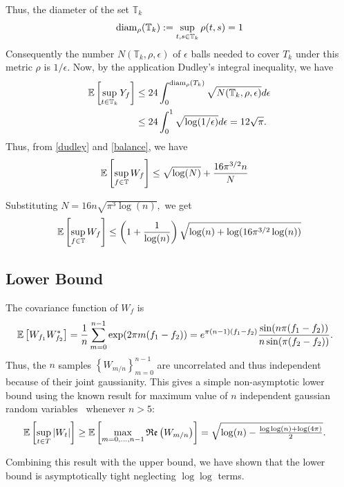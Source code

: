 Thus, the diameter of the set $\mathbb{T}_k$
\begin{align*}
\operatorname{diam}_\rho(\mathbb{T}_k) &:= \sup_{t,s  \in \mathbb{T}_k}\rho(t,s) = 1\\
\end{align*}
Consequently the number $N(\mathbb{T}_k, \rho, \epsilon)$ of $\epsilon$ balls needed to cover $T_k$ under this metric $\rho$ is $1/\epsilon$. Now, by the application Dudley's integral inequality, we have
\begin{align}
\operatorname{\mathbb{E}}\left[\sup_{t \in \mathbb{T}_k} Y_f \right] & \leq 24 \int_0^{\operatorname{diam}_\rho(T_k)} \sqrt{N(\mathbb{T}_k, \rho, \epsilon)} d\epsilon\\
 & \leq 24 \int_0^1 \sqrt{\log(1/\epsilon)} d\epsilon = 12 \sqrt{\pi}. \label{dudley}
\end{align}
Thus, from \eqref{dudley} and \eqref{balance}, we have
\begin{align*}
\operatorname{\mathbb{E}}\left[\sup_{f \in \mathbb{T}} W_f \right] & \leq  \sqrt{\log(N)} +  \frac{ 16 \pi^{3/2} n} { N}
\end{align*}


Substituting $N = 16 n \sqrt{\pi^3 \log(n)},$ we get
\[
	\operatorname{\mathbb{E}}\left[\sup_{f \in \mathbb{T}} W_f \right] \leq \left( 1 + \frac{1}{\log(n)} \right)\sqrt{\log(n) + \log(16 \pi^{3/2} \log(n))}
\]
\subsection{Lower Bound}

The covariance function of $W_f$ is
\begin{align*}
\operatorname{\mathbb{E}}\left[W_{f_1} W_{f_2}^*\right] &= \frac{1}{n}\sum_{m=0}^{n-1} \exp(2\pi m (f_1 - f_2)) = e^{\pi (n - 1) (f_1-f_2)} \frac{\sin(n \pi (f_1 - f_2) ) }{ n \sin(\pi (f_2 - f_2))}.
\end{align*}
Thus, the $n$ samples $\left\{W_{m/n}\right\}_{m=0}^{n-1}$ are uncorrelated and thus independent because of their joint gaussianity. This gives a simple non-asymptotic lower bound using the known result for maximum value of $n$ independent gaussian random variables~\cite{lr76} whenever $n > 5$:
\begin{align*}
\operatorname{\mathbb{E}}\left[\sup_{t \in T} \left| W_t \right| \right] &\geq \operatorname{\mathbb{E}}\left[\max_{m = 0, \ldots, n-1} \mathop{\mathfrak{Re}}\left( W_{m/n} \right)  \right] = \sqrt{\log(n) - \tfrac{ \log\log(n) + \log(4\pi)}{2}}.
\end{align*}

Combining this result with the upper bound, we have shown that the lower bound is asymptotically tight neglecting $\log\log$ terms.

